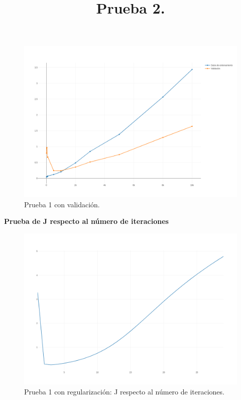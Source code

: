 {{{{{\FloatBarrier
\begin{figure}[htbp!]
		\centering
			\includegraphics[width=1 \textwidth]{imagenes/pruebassistemarecom/30_01_13}
		\caption{Prueba 1 con validación.}
		\label{gradiente_desc}
\end{figure}
\FloatBarrier
\newpage
\textbf{Prueba de J respecto al número de iteraciones}

\FloatBarrier
\begin{figure}[htbp!]
		\centering
			\includegraphics[width=1 \textwidth]{imagenes/pruebassistemarecom/2_1}
		\caption{Prueba 1 con regularización: J respecto al número de iteraciones.}
		\label{gradiente_desc}
\end{figure}
\FloatBarrier
\title{\textbf{Prueba 2.}}

}}}}}
